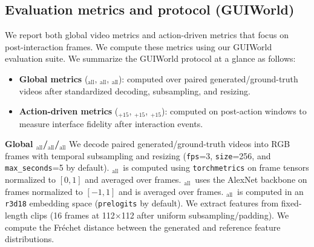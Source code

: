\subsection{Evaluation metrics and protocol (GUIWorld)}
\label{appendix:gui-metrics}
We report both global video metrics and action-driven metrics that focus on post-interaction frames. 
We compute these metrics using our GUIWorld evaluation suite.
We summarize the GUIWorld protocol at a glance as follows:
\begin{tcolorbox}[
  colback=apricotglaze!40!white,
  colframe=metablue!40,
  interior style={shade,shading angle=315,left color=white,right color=apricotglaze!55!white},
  boxrule=0pt,
  borderline west={1pt}{0pt}{gray!60},
  left=6pt,right=4pt,top=3pt,bottom=3pt]
\small
\begin{itemize}
  \setlength{\itemsep}{2pt}
  \setlength{\topsep}{2pt}
  \item \textbf{Global metrics} (\FVD$_\text{all}$, \SSIM$_\text{all}$, \LPIPS$_\text{all}$): computed over paired generated/ground-truth videos after standardized decoding, subsampling, and resizing.
  \item \textbf{Action-driven metrics} (\SSIM$_{+15}$, \LPIPS$_{+15}$, \FVD$_{+15}$): computed on post-action windows to measure interface fidelity after interaction events.
\end{itemize}
\end{tcolorbox}

\noindent\textbf{Global \FVD$_\text{all}$/\SSIM$_\text{all}$/\LPIPS$_\text{all}$}
We decode paired generated/ground-truth videos into RGB frames with temporal subsampling and resizing (\texttt{fps}=3, \texttt{size}=256, and \texttt{max\_seconds}=5 by default).
\SSIM$_\text{all}$~is computed using \texttt{torchmetrics} on frame tensors normalized to $[0,1]$ and averaged over frames.
\LPIPS$_\text{all}$~uses the AlexNet backbone on frames normalized to $[-1,1]$ and is averaged over frames.
\FVD$_\text{all}$~is computed in an \texttt{r3d18} embedding space (\texttt{prelogits} by default).
We extract features from fixed-length clips (16 frames at 112$\times$112 after uniform subsampling/padding).
We compute the Fr\'echet distance between the generated and reference feature distributions.

